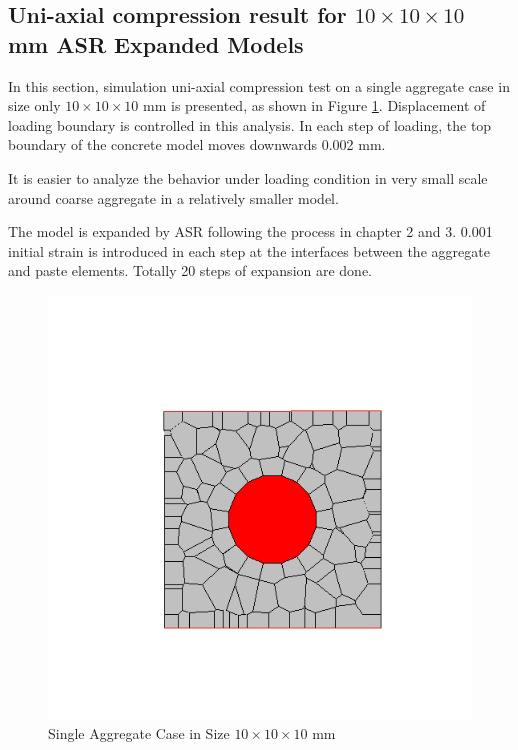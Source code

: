\subsection{Uni-axial compression result for $10 \times 10 \times 10$ mm ASR Expanded Models}

In this section, simulation uni-axial compression test on a single aggregate case in size only $10 \times 10 \times 10$ mm is presented, as shown in Figure \ref{sdfsdfasr}. Displacement of loading boundary is controlled in this analysis. In each step of loading, the top boundary of the concrete model moves downwards 0.002 mm.

It is easier to analyze the behavior under loading condition in very small scale around coarse aggregate in a relatively smaller model.

The model is expanded by ASR following the process in chapter 2 and 3. 0.001 initial strain is introduced in each step at the interfaces between the aggregate and paste elements. Totally 20 steps of expansion are done.


\begin{figure}[h!]
\centering
\includegraphics[width=0.4\linewidth]{Files/Small_ASR/CR/DEP5-STEP(001).png}
\caption{Single Aggregate Case in Size $10 \times 10 \times 10$ mm}
\label{sdfsdfasr}
\end{figure}


